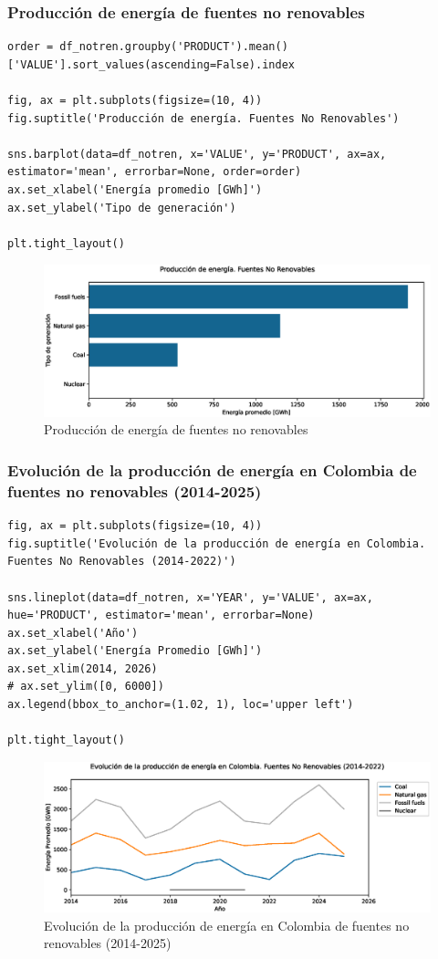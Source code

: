 \documentclass{article}
\begin{document}
\subsubsection{Producción de energía de fuentes no renovables}

\begin{verbatim}
order = df_notren.groupby('PRODUCT').mean()['VALUE'].sort_values(ascending=False).index

fig, ax = plt.subplots(figsize=(10, 4))
fig.suptitle('Producción de energía. Fuentes No Renovables')

sns.barplot(data=df_notren, x='VALUE', y='PRODUCT', ax=ax, estimator='mean', errorbar=None, order=order)
ax.set_xlabel('Energía promedio [GWh]')
ax.set_ylabel('Tipo de generación')

plt.tight_layout()	
\end{verbatim}

\begin{figure}[t]
	\centering
	\includegraphics[width=0.7\linewidth]{fig_16}
	\caption{Producción de energía de fuentes no renovables}
	\label{fig:fig16}
\end{figure}

\subsubsection{Evolución de la producción de energía en Colombia de fuentes no renovables (2014-2025)}

\begin{verbatim}
fig, ax = plt.subplots(figsize=(10, 4))
fig.suptitle('Evolución de la producción de energía en Colombia. Fuentes No Renovables (2014-2022)')

sns.lineplot(data=df_notren, x='YEAR', y='VALUE', ax=ax, hue='PRODUCT', estimator='mean', errorbar=None)
ax.set_xlabel('Año')
ax.set_ylabel('Energía Promedio [GWh]')
ax.set_xlim(2014, 2026)
# ax.set_ylim([0, 6000])
ax.legend(bbox_to_anchor=(1.02, 1), loc='upper left')

plt.tight_layout()
\end{verbatim}

\begin{figure}[t]
	\centering
	\includegraphics[width=0.7\linewidth]{fig_17}
	\caption{Evolución de la producción de energía en Colombia de fuentes no renovables (2014-2025)}
	\label{fig:fig17}
\end{figure}
\end{document}
